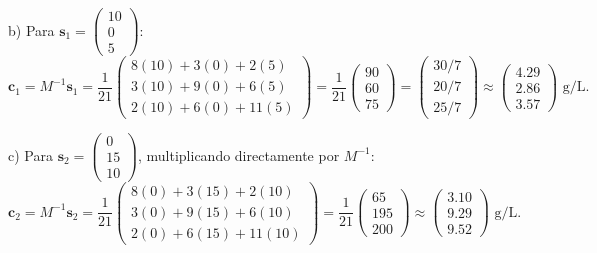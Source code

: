 \documentclass[11pt,letterpaper]{article}
\theoremstyle{definition}
\theoremstyle{plain}
\newcommand{\vv}[1]{\mathbf{#1}}
\begin{document}
b) Para $\vv{s}_1 = \begin{pmatrix} 10 \\ 0 \\ 5 \end{pmatrix}$:
\[
\vv{c}_1 = M^{-1}\vv{s}_1 = \frac{1}{21} \begin{pmatrix} 8(10)+3(0)+2(5) \\ 3(10)+9(0)+6(5) \\ 2(10)+6(0)+11(5) \end{pmatrix} = \frac{1}{21} \begin{pmatrix} 90 \\ 60 \\ 75 \end{pmatrix} = \begin{pmatrix} 30/7 \\ 20/7 \\ 25/7 \end{pmatrix} \approx \begin{pmatrix} 4.29 \\ 2.86 \\ 3.57 \end{pmatrix} \text{ g/L}.
\]

c) Para $\vv{s}_2 = \begin{pmatrix} 0 \\ 15 \\ 10 \end{pmatrix}$, multiplicando directamente por $M^{-1}$:
\[
\vv{c}_2 = M^{-1}\vv{s}_2 = \frac{1}{21} \begin{pmatrix} 8(0)+3(15)+2(10) \\ 3(0)+9(15)+6(10) \\ 2(0)+6(15)+11(10) \end{pmatrix} = \frac{1}{21} \begin{pmatrix} 65 \\ 195 \\ 200 \end{pmatrix} \approx \begin{pmatrix} 3.10 \\ 9.29 \\ 9.52 \end{pmatrix} \text{ g/L}.
\]
\end{document}

